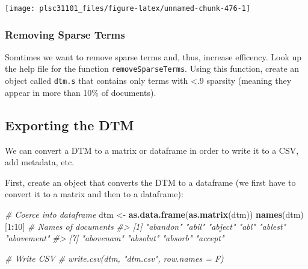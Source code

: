\documentclass[
]{book}
\newenvironment{Shaded}{\begin{snugshade}}{\end{snugshade}}
\newcommand{\CommentTok}[1]{\textcolor[rgb]{0.56,0.35,0.01}{\textit{#1}}}
\newcommand{\DecValTok}[1]{\textcolor[rgb]{0.00,0.00,0.81}{#1}}
\newcommand{\KeywordTok}[1]{\textcolor[rgb]{0.13,0.29,0.53}{\textbf{#1}}}
\newcommand{\NormalTok}[1]{#1}
\newcommand{\OperatorTok}[1]{\textcolor[rgb]{0.81,0.36,0.00}{\textbf{#1}}}
\newcommand{\StringTok}[1]{\textcolor[rgb]{0.31,0.60,0.02}{#1}}
\begin{document}
\begin{center}\texttt{[image: plsc31101\_files/figure-latex/unnamed-chunk-476-1]} \end{center}

\hypertarget{removing-sparse-terms}{%
\subsubsection*{Removing Sparse Terms}\label{removing-sparse-terms}}

Somtimes we want to remove sparse terms and, thus, increase efficency. Look up the help file for the function \texttt{removeSparseTerms}. Using this function, create an object called \texttt{dtm.s} that contains only terms with \textless.9 sparsity (meaning they appear in more than 10\% of documents).

\begin{Shaded}
\end{Shaded}

\hypertarget{exporting-the-dtm}{%
\subsection{Exporting the DTM}\label{exporting-the-dtm}}

We can convert a DTM to a matrix or dataframe in order to write it to a CSV, add metadata, etc.

First, create an object that converts the DTM to a dataframe (we first have to convert it to a matrix and then to a dataframe):

\begin{Shaded}
\begin{Highlighting}[]
\CommentTok{# Coerce into dataframe}
\NormalTok{dtm <-}\StringTok{ }\KeywordTok{as.data.frame}\NormalTok{(}\KeywordTok{as.matrix}\NormalTok{(dtm))}
\KeywordTok{names}\NormalTok{(dtm)[}\DecValTok{1}\OperatorTok{:}\DecValTok{10}\NormalTok{]  }\CommentTok{# Names of documents}
\CommentTok{#>  [1] "abandon"   "abil"      "abject"    "abl"       "ablest"    "abovement"}
\CommentTok{#>  [7] "abovenam"  "absolut"   "absorb"    "accept"}

\CommentTok{# Write CSV}
\CommentTok{# write.csv(dtm, "dtm.csv", row.names = F)}
\end{Highlighting}
\end{Shaded}
\end{document}
